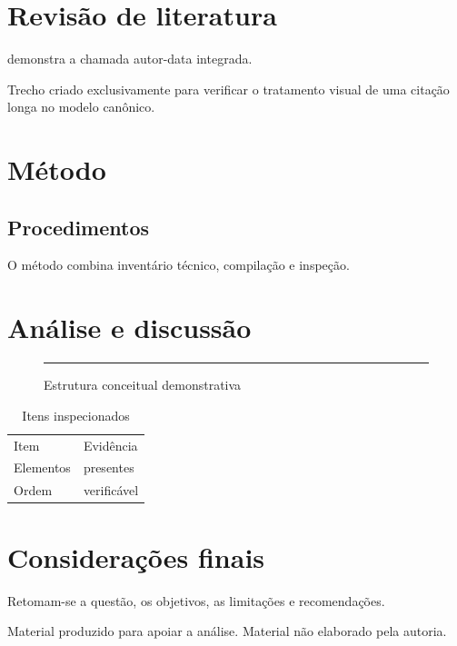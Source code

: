 \documentclass[12pt]{report}
\begin{document}
\chapter{Revisão de literatura}
\textcite{associacao2025} demonstra a chamada autor-data integrada.
\begin{ABNTEXcitacaolonga}
Trecho criado exclusivamente para verificar o tratamento visual de uma
citação longa no modelo canônico.
\end{ABNTEXcitacaolonga}

\chapter{Método}
\section{Procedimentos}
O método combina inventário técnico, compilação e inspeção.

\chapter{Análise e discussão}
\begin{figure}[ht]
  \centering
  \rule{0.55\linewidth}{2cm}
  \caption{Estrutura conceitual demonstrativa}
\end{figure}
\begin{table}[ht]
  \centering
  \caption{Itens inspecionados}
  \begin{tabular}{ll}
    Item & Evidência\\
    Elementos & presentes\\
    Ordem & verificável
  \end{tabular}
\end{table}

\chapter{Considerações finais}
Retomam-se a questão, os objetivos, as limitações e recomendações.

\ABNTEXacademicopostextual
\ABNTEXbibliografia
\ABNTEXglossario
{}
Material produzido para apoiar a análise.
Material não elaborado pela autoria.
\end{document}
